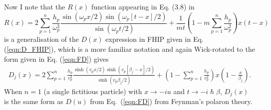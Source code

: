 Now I note that the $R(x)$ function appearing in Eq. (3.8) in \cite{poulter_complete_1992} 
\begin{equation}
    R(x) = 2 \sum_{p = 1}^n \frac{h_p}{\omega_p^3} \frac{\sin(\omega_p x / 2) \sin(\omega_p [t - x] / 2)}{\sin(\omega_p t / 2)} + \frac{1}{mt} \left( 1 - m \sum_{p = 1}^n \frac{h_p}{\omega_p^2} \right) x (t - x)
\end{equation}
is a generalisation of the $D(x)$ expression in FHIP given in Eq. (\ref{eqn:D_FHIP}), which is a more familiar notation and again Wick-rotated to the form given in Eq. (\ref{eqn:FD}) gives
\begin{equation}\label{eqn:multi_D}
\begin{gathered}
    D_j(x) = 2 \sum_{p=1}^n \frac{h_{p}}{v_{p}^3} \frac{\sinh{(v_{p} x/2)\sinh{(v_{p}[\beta_j-x]/2)}}}{\sinh(v_{p}\beta_j/2)}
    + \left( 1 - \sum_{p = 1}^n \frac{h_{p}}{v_{p}^2} \right) x \left(1 - \frac{x}{\beta_j}\right).
\end{gathered}
\end{equation}
When $n=1$ (a single fictitious particle) with $x \rightarrow -iu$ and $t \rightarrow -i\hslash\beta$, $D_j(x)$ is the same form as $D(u)$ from Eq.~(\ref{eqn:FD}) from Feynman's polaron theory. 

